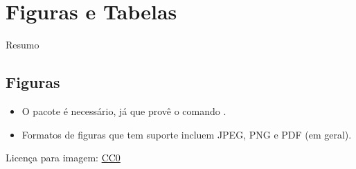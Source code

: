 \documentclass{beamer}
\begin{document}
\section{Figuras e Tabelas}

\begin{frame}{Resumo}
\begin{multicols}{2}
\tableofcontents[currentsection]
\end{multicols}
\end{frame}

\subsection{Figuras}
\begin{frame}[fragile]{\insertsubsection}
\begin{itemize}
\item O pacote  é necessário, já que provê o comando
.
\item Formatos de figuras que tem suporte incluem JPEG, PNG e PDF (em geral).
\end{itemize}

\tiny{Licença para imagem: \href{https://pixabay.com/en/animal-apple-attractive-beautiful-1239390/}{CC0}}
\end{frame}
\end{document}
